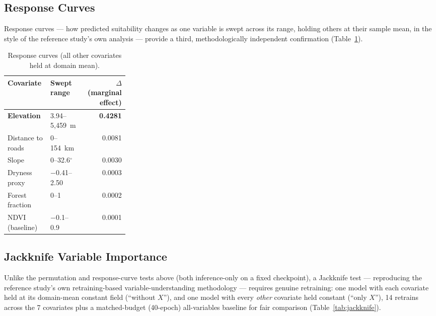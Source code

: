 \documentclass[journal]{IEEEtran}
\begin{document}
\subsection{Response Curves}

Response curves --- how predicted suitability changes as one variable is swept across its range, holding others at their sample mean, in the style of the reference study's own analysis --- provide a third, methodologically independent confirmation (Table~\ref{tab:response}).

\begin{table}[t]
\centering
\caption{Response curves (all other covariates held at domain mean).}
\label{tab:response}
\begin{tabular}{lp{0.28\linewidth}r}
\toprule
\textbf{Covariate} & \textbf{Swept range} & \textbf{$\Delta$ (marginal effect)} \\
\midrule
\textbf{Elevation} & 3.94--5,459~m & \textbf{0.4281} \\
Distance to roads & 0--154~km & 0.0081 \\
Slope & 0--32.6$^{\circ}$ & 0.0030 \\
Dryness proxy & $-$0.41--2.50 & 0.0003 \\
Forest fraction & 0--1 & 0.0002 \\
NDVI (baseline) & $-$0.1--0.9 & 0.0001 \\
\bottomrule
\end{tabular}
\end{table}

\subsection{Jackknife Variable Importance}

Unlike the permutation and response-curve tests above (both inference-only on a fixed checkpoint), a Jackknife test --- reproducing the reference study's own retraining-based variable-understanding methodology --- requires genuine retraining: one model with each covariate held at its domain-mean constant field (``without $X$''), and one model with every \emph{other} covariate held constant (``only $X$''), 14 retrains across the 7 covariates plus a matched-budget (40-epoch) all-variables baseline for fair comparison (Table~\ref{tab:jackknife}).
\end{document}
